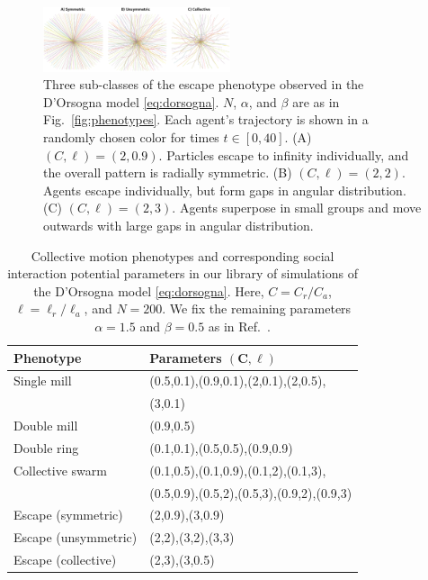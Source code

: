 \documentclass[%
 aip,
reprint,
 amsmath,amssymb,
 aps,
showkeys
]{revtex4-1}
\begin{document}
\begin{figure}[ht]
    \centering
    \includegraphics[width=0.49\textwidth]{Escape_Phenotypes_Updated.png}
    \caption{Three sub-classes of the escape phenotype observed in the D'Orsogna model \eqref{eq:dorsogna}. $N$, $\alpha$, and $\beta$ are as in Fig.~\ref{fig:phenotypes}. Each agent's trajectory is shown in a randomly chosen color for times $t \in [0, 40]$.
(A) $(C, \ell) = (2, 0.9)$. Particles escape to infinity individually, and the overall pattern is radially symmetric.
(B) $(C, \ell) = (2, 2)$. Agents escape individually, but form gaps in angular distribution.
(C) $(C, \ell) = (2, 3)$. Agents superpose in small groups and move outwards with large gaps in angular distribution. \label{fig:escape}}
\end{figure}

\begin{table}[h]
\caption{\label{tab:phenotype_params}Collective motion phenotypes and corresponding social interaction potential parameters in our library of simulations of the D'Orsogna model \eqref{eq:dorsogna}. Here, $C=C_r/C_a$, $\ell = \ell_r/\ell_a$, and $N=200$. We fix the remaining parameters $\alpha=1.5$ and $\beta=0.5$ as in Ref.~.}
\begin{ruledtabular}
\begin{tabular}{ll}
\textbf{Phenotype} & \textbf{Parameters} $\mathbf{(C,\ell)}$   \\\hline\hline
 Single mill & (0.5,0.1),(0.9,0.1),(2,0.1),(2,0.5), \\
 & (3,0.1)\\
 Double mill & (0.9,0.5)  \\
 Double ring & (0.1,0.1),(0.5,0.5),(0.9,0.9)  \\
 Collective swarm & (0.1,0.5),(0.1,0.9),(0.1,2),(0.1,3), \\
 & (0.5,0.9),(0.5,2),(0.5,3),(0.9,2),(0.9,3)\\
 Escape (symmetric) & (2,0.9),(3,0.9)\\
 Escape (unsymmetric) & (2,2),(3,2),(3,3)\\
 Escape (collective) & (2,3),(3,0.5)\\
\end{tabular}
\end{ruledtabular}
\end{table}
\end{document}
